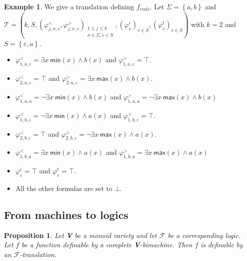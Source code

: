 \documentclass[12pt]{report}
\newtheorem{prp}{Proposition}[section]
\theoremstyle{definition}
\newtheorem{xmp}{Example}[section]
\theoremstyle{remark}
\begin{document}
\begin{xmp}
We give a translation defining $f_{ends}$.
Let $\Sigma=\left\{a,b\right\}$ and $\mathcal T=\left(k,S,\left(\varphi_{j,\sigma,v}^<,\varphi_{j,\sigma,v}^>\right)_{\begin{smallmatrix} 1\leq j\leq k\\ \sigma \in \Sigma, v\in S \end{smallmatrix}},\left(\varphi_v^i\right)_{v\in S},\left(\varphi_v^t\right)_{v\in S}\right)$ with $k=2$ and $S=\left\{\varepsilon,a\right\}$.
\begin{itemize}
\item $\varphi_{1,a,\varepsilon}^<=\exists x\ \mathsf{min}(x) \wedge b(x)$ and $\varphi_{1,a,\varepsilon}^>=\top$.
\item $\varphi_{2,a,\varepsilon}^<=\top$ and $\varphi_{2,a,\varepsilon}^>=\exists x\ \mathsf{max}(x) \wedge b(x)$.
\item $\varphi_{1,a,a}^<=\neg \exists x\ \mathsf{min}(x) \wedge b(x)$ and $\varphi_{1,a,a}^>=\neg \exists x\ \mathsf{max}(x) \wedge b(x)$
\item $\varphi_{1,b,\varepsilon}^<=\neg\exists x\ \mathsf{min}(x) \wedge a(x)$ and $\varphi_{1,b,\varepsilon}^>=\top$.
\item $\varphi_{2,b,\varepsilon}^<=\top$ and $\varphi_{2,b,\varepsilon}^>=\neg\exists x\ \mathsf{max}(x) \wedge a(x)$.
\item $\varphi_{1,b,a}^<=\exists x\ \mathsf{min}(x) \wedge a(x)$ and $\varphi_{1,b,a}^>=\exists x\ \mathsf{max}(x) \wedge a(x)$
\item $\varphi_\varepsilon^i=\top$ and $\varphi_\varepsilon^t=\top$.
\item All the other formulas are set to $\bot$.
\end{itemize}

\end{xmp}

\subsection{From machines to logics}


\begin{prp}
\label{prpbt}
Let \textbf V be a monoid variety and let $\mathcal F$ be a corresponding logic.
Let $f$ be a function definable by a complete \textbf V-bimachine. Then $f$ is definable by an $\mathcal F$-translation.
\end{prp}
\end{document}
